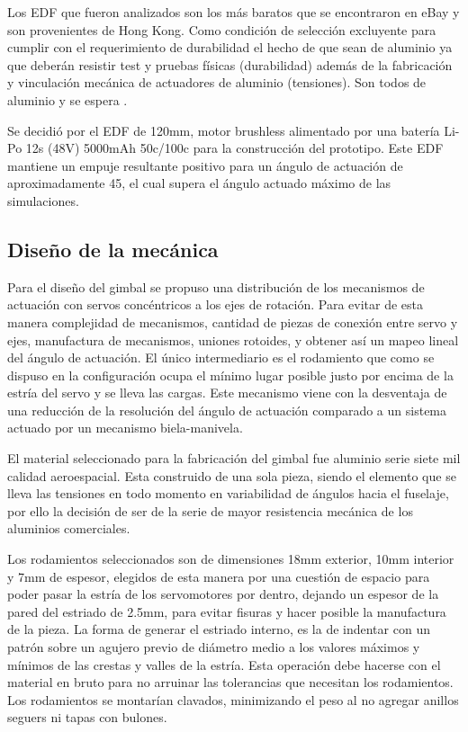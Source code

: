 \medskip

Los EDF que fueron analizados son los más baratos que
se encontraron en eBay y son provenientes de Hong Kong. Como condición de selección excluyente para cumplir con el requerimiento de durabilidad el hecho de que sean de aluminio ya que deberán resistir test y pruebas físicas
(durabilidad) además de la fabricación y vinculación mecánica de actuadores de aluminio
(tensiones). Son todos de aluminio y se espera .

\medskip

Se decidió por el EDF de 120mm, motor brushless alimentado por una batería Li-Po 12s (48V) 5000mAh 50c/100c para la construcción del prototipo. Este EDF mantiene un empuje resultante positivo para un ángulo de actuación de aproximadamente 45\grad , el cual supera el ángulo actuado máximo de las simulaciones.







\subsection{Diseño de la mecánica}

Para el diseño del gimbal se propuso una distribución de los mecanismos de actuación con
servos concéntricos a los ejes de rotación. Para evitar de esta manera complejidad de
mecanismos, cantidad de piezas de conexión entre servo y ejes, manufactura de mecanismos,
uniones rotoides, y obtener así un mapeo lineal del ángulo de actuación. El único intermediario
es el rodamiento que como se dispuso en la configuración ocupa el mínimo lugar posible justo
por encima de la estría del servo y se lleva las cargas.
Este mecanismo viene con la desventaja de una reducción de la resolución del ángulo de actuación comparado a un sistema actuado por un mecanismo biela-manivela.

\medskip

El material seleccionado para la fabricación del gimbal fue aluminio serie siete mil calidad
aeroespacial. Esta construido de una sola pieza, siendo el elemento que se lleva las tensiones
en todo momento en variabilidad de ángulos hacia el fuselaje, por ello la decisión de ser de la
serie de mayor resistencia mecánica de los aluminios comerciales.

\medskip

Los rodamientos seleccionados son de dimensiones 18mm exterior, 10mm interior y 7mm de espesor,
elegidos de esta manera por una cuestión de espacio para poder pasar la estría de los
servomotores por dentro, dejando un espesor de la pared del estriado de 2.5mm,
para evitar fisuras y hacer posible la manufactura de la pieza. La forma de generar el estriado
interno, es la de indentar con un patrón sobre un agujero previo de diámetro medio a los
valores máximos y mínimos de las crestas y valles de la estría. Esta operación debe hacerse con
el material en bruto para no arruinar las tolerancias que necesitan los rodamientos. Los
rodamientos se montarían clavados, minimizando el peso al no agregar anillos seguers ni tapas con
bulones.

